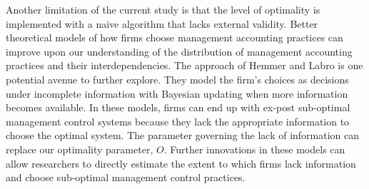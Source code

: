 \documentclass[12pt]{article}
\begin{document}
Another limitation of the current study is that the level of optimality is implemented with a naive algorithm that lacks external validity. Better theoretical models of how firms choose management accounting practices can improve upon our understanding of the distribution of management accounting practices and their interdependencies. The approach of Hemmer and Labro \citeyearpar{hemmer_management_2019} is one potential avenue to further explore. They model the firm's choices as decisions under incomplete information with Bayesian updating when more information becomes available. In these models, firms can end up with ex-post sub-optimal management control systems because they lack the appropriate information to choose the optimal system. The parameter governing the lack of information can replace our optimality parameter, \(O\). Further innovations in these models can allow researchers to directly estimate the extent to which firms lack information and choose sub-optimal management control practices.

\pagebreak
 
\appendix
\renewcommand{\theequation}{A.\arabic{equation}}
\setcounter{equation}{0}
\end{document}
